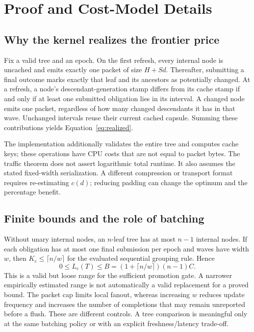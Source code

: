 \section{Proof and Cost-Model Details}
\subsection{Why the kernel realizes the frontier price}
Fix a valid tree and an epoch. On the first refresh, every internal node is uncached and emits exactly one packet of size $H+Sd$. Thereafter, submitting a final outcome marks exactly that leaf and its ancestors as potentially changed. At a refresh, a node's descendant-generation stamp differs from its cache stamp if and only if at least one submitted obligation lies in its interval. A changed node emits one packet, regardless of how many changed descendants it has in that wave. Unchanged intervals reuse their current cached capsule. Summing these contributions yields Equation~\eqref{eq:realized}.

The implementation additionally validates the entire tree and computes cache keys; these operations have CPU costs that are not equal to packet bytes. The traffic theorem does not assert logarithmic total runtime. It also assumes the stated fixed-width serialization. A different compression or transport format requires re-estimating $c(d)$; reducing padding can change the optimum and the percentage benefit.

\subsection{Finite bounds and the role of batching}
Without unary internal nodes, an $n$-leaf tree has at most $n-1$ internal nodes. If each obligation has at most one final submission per epoch and waves have width $w$, then $K_e\le\lceil n/w\rceil$ for the evaluated sequential grouping rule. Hence
\begin{equation}
 0\le L_e(T)\le B=(1+\lceil n/w\rceil)(n-1)C.
\end{equation}
This is a valid but loose range for the sufficient promotion gate. A narrower empirically estimated range is not automatically a valid replacement for a proved bound. The packet cap limits local fanout, whereas increasing $w$ reduces update frequency and increases the number of completions that may remain unreported before a flush. These are different controls. A tree comparison is meaningful only at the same batching policy or with an explicit freshness/latency trade-off.

